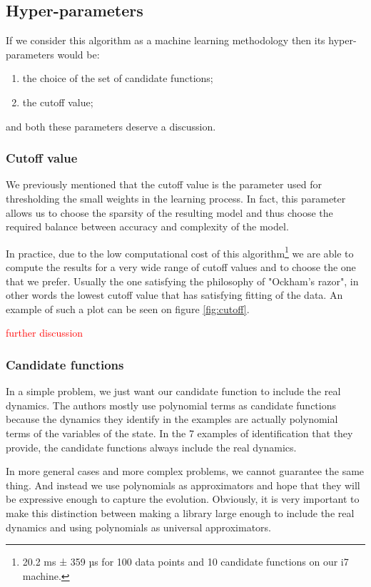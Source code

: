 \documentclass[12pt, letterpaper]{article}
\newcommand{\com}[1]{{\small {\fontfamily{ptm} \selectfont \textcolor{red}{#1}}}}
\begin{document}
\subsection{Hyper-parameters}

If we consider this algorithm as a machine learning methodology then its hyper-parameters would be:
\begin{enumerate} 
    \item the choice of the set of candidate functions;
    \item the cutoff value; 
\end{enumerate}
and both these parameters deserve a discussion.

\subsubsection{Cutoff value}

We previously mentioned that the cutoff value is the parameter used for thresholding the small weights in the learning process. 
In fact, this parameter allows us to choose the sparsity of the resulting model and thus choose the required balance between accuracy and complexity of the model.

In practice, due to the low computational cost of this algorithm\footnote{20.2 ms ± 359 µs for 100 data points and 10 candidate functions on our i7 machine.} we are able to compute the results for a very wide range of cutoff values and to choose the one that we prefer. 
Usually the one satisfying the philosophy of "Ockham's razor", in other words the lowest cutoff value that has satisfying fitting of the data. 
An example of such a plot can be seen on figure \ref{fig:cutoff}. 

\com{further discussion}

\subsubsection{Candidate functions}\label{sec:polynomials}

In a simple problem, we just want our candidate function to include the real dynamics. 
The authors mostly use polynomial terms as candidate functions because the dynamics they identify in the examples are actually polynomial terms of the variables of the state. 
In the 7 examples of identification that they provide, the candidate functions always include the real dynamics. 

In more general cases and more complex problems, we cannot guarantee the same thing. 
And instead we use polynomials as approximators and hope that they will be expressive enough to capture the evolution. 
Obviously, it is very important to make this distinction between making a library large enough to include the real dynamics and using polynomials as universal approximators. 
\end{document}
